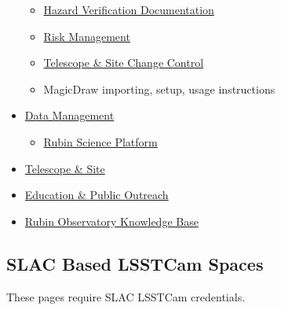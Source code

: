 \begin{small}
\begin{itemize}
\begin{itemize}
		\item \href{https://confluence.lsstcorp.org/display/SYSENG/Hazard+Mitigation+Verification+Documentation}{Hazard Verification Documentation}
		\item \href{https://confluence.lsstcorp.org/display/RM/Risk+Management+on+JIRA}{Risk Management}
		\item \href{https://confluence.lsstcorp.org/pages/viewpage.action?pageId=3113550}{Telescope \& Site Change Control}
		\item MagicDraw importing, setup, usage instructions
	\end{itemize}
	\item \href{https://confluence.lsstcorp.org/display/DM/Data+Management+Home}{Data Management}
	\begin{itemize}
		\item \href{https://confluence.lsstcorp.org/display/LSP/Science+Platform+Operations+Home}{Rubin Science Platform}
	\end{itemize}
	\item \href{https://https//confluence.lsstcorp.org/pages/viewpage.action?pageId=1507765}{Telescope \& Site}
	\item \href{https://confluence.lsstcorp.org/pages/viewpage.action?pageId=25690606}{Education \& Public Outreach}
	\item \href{https://confluence.lsstcorp.org/display/LKB/Rubin+Lessons+Learned}{Rubin Observatory Knowledge Base}
\end{itemize}

\subsection{SLAC Based LSSTCam Spaces}
These pages require SLAC LSSTCam credentials.


\end{small}
